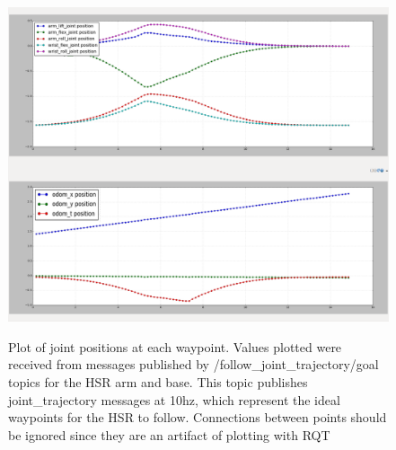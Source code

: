 \documentclass[11pt]{article}
\begin{document}

        \begin{figure}
            \centering
            \includegraphics[width=0.95\linewidth]{2020.03.31/hsr_driveby_trajectory_position_fixed.png}
            \label{fig:idealPos}
            \caption{Plot of joint positions at each waypoint. Values plotted were received from messages published by /follow\_joint\_trajectory/goal topics for the HSR arm and base. This topic publishes joint\_trajectory messages at 10hz, which represent the ideal waypoints for the HSR to follow. Connections between points should be ignored since they are an artifact of plotting with RQT}
        \end{figure}
\end{document}
